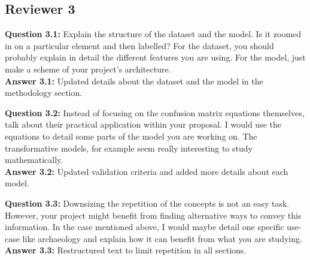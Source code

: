 \vspace{1em}

\pagebreak

\subsection{Reviewer 3}

\textbf{Question 3.1:} Explain the structure of the dataset and the model. Is it zoomed in on a particular element and then labelled? For the dataset, you should probably explain in detail the different features you are using. For the model, just make a scheme of your project's architecture.\\
\textbf{Answer 3.1:} Updated details about the dataset and the model in the methodology section.

\vspace{1em}

\textbf{Question 3.2:} Instead of focusing on the confusion matrix equations themselves, talk about their practical application within your proposal. I would use the equations to detail some parts of the model you are working on. The transformative models, for example seem really interesting to study mathematically.\\
\textbf{Answer 3.2:} Updated validation criteria and added more details about each model.

\vspace{1em}

\textbf{Question 3.3:} Downsizing the repetition of the concepts is not an easy task. However, your project might benefit from finding alternative ways to convey this information. In the case mentioned above, I would maybe detail one specific use-case like archaeology and explain how it can benefit from what you are studying.\\
\textbf{Answer 3.3:} Restructured text to limit repetition in all sections.